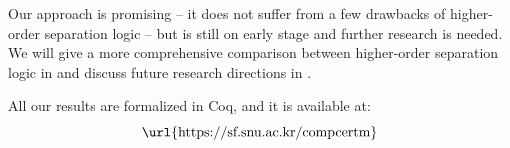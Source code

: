 
Our approach is promising -- it does not suffer from a few drawbacks of higher-order separation logic -- but is still on early stage and further research is needed.
We will give a more comprehensive comparison between higher-order separation logic in  and discuss future research directions in .









\bigskip
All our results are formalized in Coq, and it is available at: \[ \text{\url{https://sf.snu.ac.kr/compcertm}} \]

